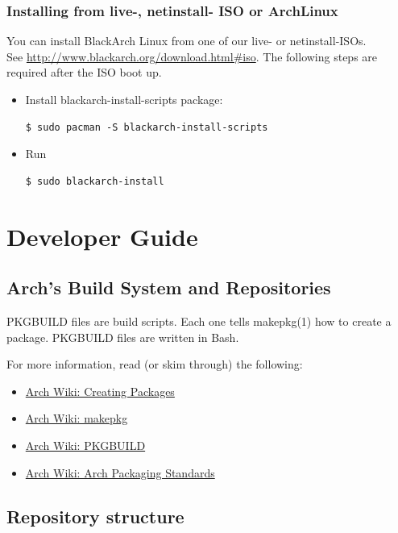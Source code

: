 \documentclass[a4paper, oneside, 11pt]{book}
\begin{document}
\subsection{Installing from live-, netinstall- ISO or ArchLinux}
You can install BlackArch Linux from one of our live- or netinstall-ISOs.\\See
\url{http://www.blackarch.org/download.html#iso}. The following steps are
required after the ISO boot up.
\begin{itemize}
\item Install blackarch-install-scripts package:
{\small
\color{gray}
\begin{verbatim}
$ sudo pacman -S blackarch-install-scripts
\end{verbatim}
}
\item Run
{\small
\color{gray}
\begin{verbatim}
$ sudo blackarch-install
\end{verbatim}
}
\end{itemize}


\chapter{Developer Guide}

\section{Arch's Build System and Repositories}

PKGBUILD files are build scripts. Each one tells makepkg(1) how to create a package. PKGBUILD files
are written in Bash.

For more information, read (or skim through) the following:
\begin{itemize}
	\item \href{https://wiki.archlinux.org/index.php/Creating_Packages}{Arch Wiki: Creating Packages}
	\item \href{https://wiki.archlinux.org/index.php/Makepkg}{Arch Wiki: makepkg}
	\item \href{https://wiki.archlinux.org/index.php/PKGBUILD}{Arch Wiki: PKGBUILD}
	\item \href{https://wiki.archlinux.org/index.php/Arch_Packaging_Standards}{Arch Wiki: Arch Packaging Standards}
\end{itemize}

\section{Repository structure}
\end{document}
